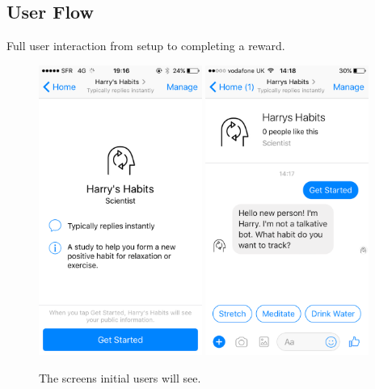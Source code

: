 \subsection{User Flow}

Full user interaction from setup to completing a reward.

\begin{figure}[H]
  \centering
  \includegraphics[width=2.1in]{../resources/design/media/1.png}
  \hspace{10px}
  \includegraphics[width=2.1in]{../resources/design/media/2.png}
  \caption{The screens initial users will see.}
  \label{fig:setup_media_1}
\end{figure}

